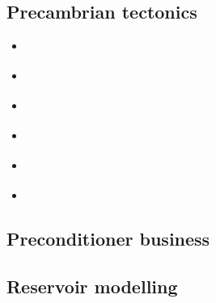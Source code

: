 \subsection{Precambrian tectonics}

\begin{scriptsize}
\begin{itemize}
\item[\nineteenninetyfour] \cite{guto94}
\item[\twothousandthree] \cite{wemv03}
\item[\twothousandten] \cite{sigb10}
\item[\twothousandeleven] \cite{pege11}
\item[\twothousandfourteen] \cite{gery14}\cite{gagb14}\cite{sigb14}
\item[\twothousandtwenty] \cite{poyd20}
\end{itemize}
\end{scriptsize}

\subsection{Preconditioner business}

\begin{scriptsize}
\cite{benz02}
\cite{bewa08}
\cite{urvs08}
\end{scriptsize}

\subsection{Reservoir modelling}

